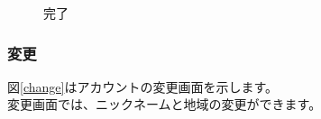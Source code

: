 \documentclass[a4j]{jarticle}
\begin{document}
\begin{figure}[H]
    \begin{center}
    \caption {完了}
    \label{check}
    \end{center}
\end{figure}

\newpage
\subsubsection{変更}
図\ref{change}はアカウントの変更画面を示します。\\
変更画面では、ニックネームと地域の変更ができます。
\end{document}
